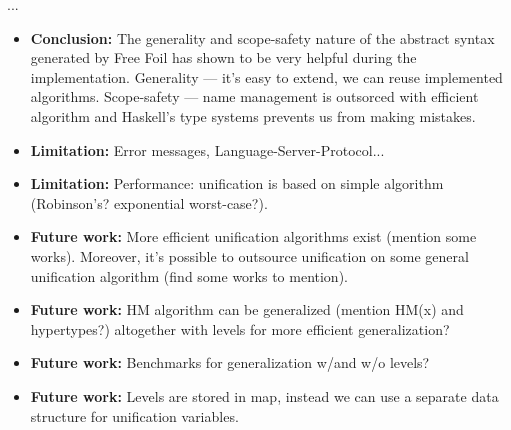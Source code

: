...

\begin{itemize}
  \item \textbf{Conclusion:} The generality and scope-safety nature of the abstract syntax generated by Free Foil has shown to be very helpful during the implementation. Generality — it's easy to extend, we can reuse implemented algorithms. Scope-safety — name management is outsorced with efficient algorithm and Haskell's type systems prevents us from making mistakes.
  \item \textbf{Limitation:} Error messages, Language-Server-Protocol...
  \item \textbf{Limitation:} Performance: unification is based on simple algorithm (Robinson's? exponential worst-case?). 
  \item \textbf{Future work:} More efficient unification algorithms exist (mention some works). Moreover, it's possible to outsource unification on some general unification algorithm (find some works to mention).
  \item \textbf{Future work:} HM algorithm can be generalized (mention HM(x) and hypertypes?) altogether with levels for more efficient generalization?
  \item \textbf{Future work:} Benchmarks for generalization w/and w/o levels?
  \item \textbf{Future work:} Levels are stored in map, instead we can use a separate data structure for unification variables.
\end{itemize}

